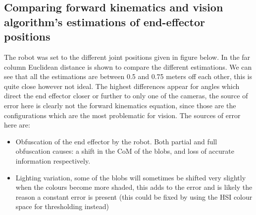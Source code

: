 \documentclass[11pt]{report}
\begin{document}
\subsection*{Comparing forward kinematics and vision algorithm's estimations of end-effector positions}

The robot was set to the different joint positions given in figure below. In the far column Euclidean distance is shown to compare the different estimations. We can see that all the estimations are between 0.5 and 0.75 meters off each other, this is quite close however not ideal. The highest differences appear for angles which direct the end effector closer or further to only one of the cameras, the source of error here is clearly not the forward kinematics equation, since those are the configurations which are the most problematic for vision. The sources of error here are:
\begin{itemize}
    \item Obfuscation of the end effector by the robot. Both partial and full obfuscation causes: a shift in the CoM of the blobs, and loss of accurate information respectively.
    \item Lighting variation, some of the blobs will sometimes be shifted very slightly when the colours become more shaded, this adds to the error and is likely the reason a constant error is present (this could be fixed by using the HSI colour space for thresholding instead)

\end{itemize}
\end{document}
